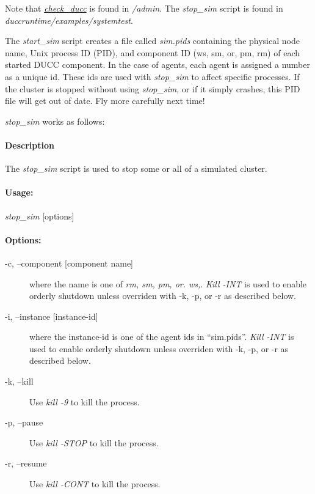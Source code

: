     Note that \hyperref[subsec:admin.check-ducc]{{\em check\_ducc}} is found in 
    {\em \duccruntime/admin}.  The {\em stop\_sim} script is found in {\em
      duccruntime/examples/systemtest}.  
   
    The {\em start\_sim} script creates a file called {\em sim.pids} containing the
    physical node name, Unix process ID (PID), and component ID (ws, sm, or, pm, rm) of
    each started DUCC component.  In the case of agents, each agent is assigned a
    number as a unique id.  These ids are used with {\em stop\_sim} to affect
    specific processes.  If the cluster is stopped without using {\em stop\_sim}, or
    if it simply crashes, this PID file will get out of date.  Fly more carefully
    next time!

    {\em stop\_sim} works as follows:
    \paragraph{Description}
    The {\em stop\_sim} script is used to stop some or all of a simulated cluster.
    
    \paragraph{Usage:}
    {\em stop\_sim} [options]

    \paragraph{Options:}
    \begin{description}
      \item[-c, --component {[component name]}] where the name is one of {\em
        rm, sm, pm, or. ws,}.  {\em Kill -INT} is used to enable orderly shutdown
      unless overriden with -k, -p, or -r as described below.
      \item[-i, --instance {[instance-id]}] where the instance-id is one of the
        agent ids in ``sim.pids''. {\em Kill -INT} is used to enable orderly shutdown
      unless overriden with -k, -p, or -r as described below.
      \item[-k, --kill] Use {\em kill -9} to kill the process.
      \item[-p, --pause] Use {\em kill -STOP} to kill the process.
      \item[-r, --resume] Use {\em kill -CONT} to kill the process.
    \end{description}
    
